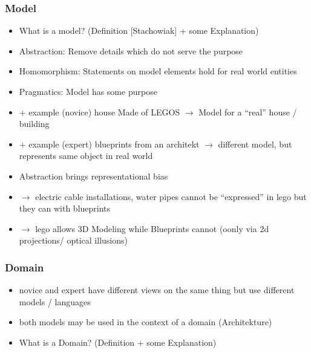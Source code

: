\documentclass[runningheads,a4paper]{llncs}
\begin{document}
\subsubsection{Model}
\begin{itemize}
 \item What is a model? (Definition  [Stachowiak]
 + some Explanation)
 \item Abstraction: Remove details which do not serve the purpose

 \item Homomorphism: Statements on model elements hold for real world entities
 \item Pragmatics: Model has some purpose
 \item + example (novice) house Made of LEGOS $\rightarrow $ Model for a ``real'' house / building
 \item + example (expert) blueprints from an architekt $\rightarrow $ different model, but  represents same object in real 
 world
 
 \item Abstraction brings representational bias 
 \item $\rightarrow$ electric cable installations, water pipes cannot be ``expressed'' in lego but they can with blueprints
 \item $\rightarrow$ lego allows 3D Modeling while Blueprints cannot (oonly via 2d projections/ optical illusions)
 \end{itemize}
  
\subsubsection{Domain}
\begin{itemize}
 \item novice and expert have different views on the same thing  but use different models / languages
 \item both models may be used in the context of a domain (Architekture)
 \item What is a Domain? (Definition + some Explanation)
  \end{itemize}
  
\end{document}

